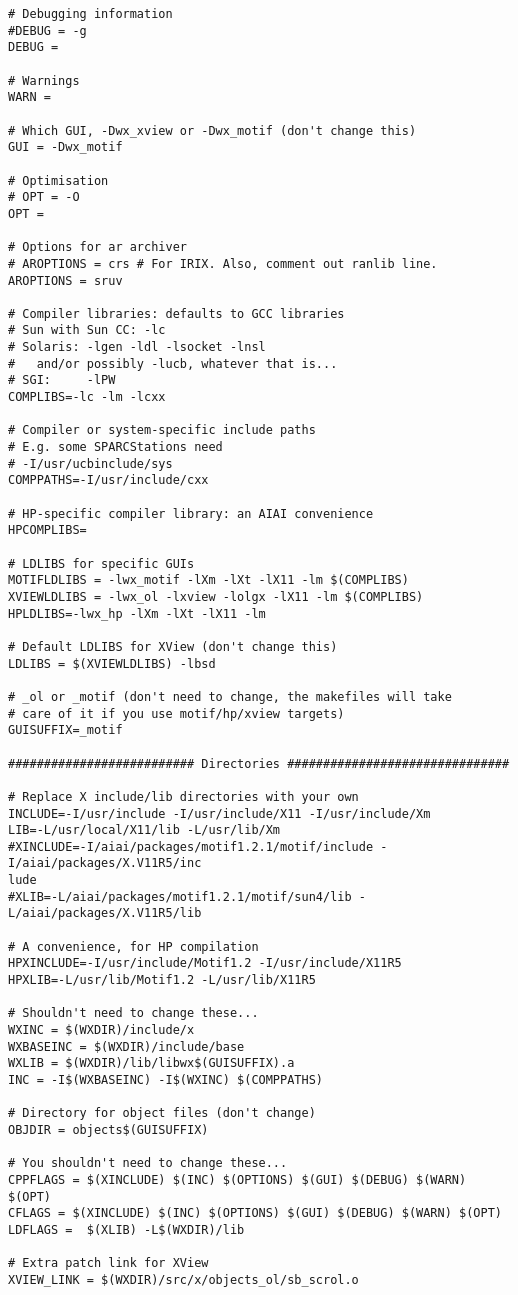 \begin{verbatim}
# Debugging information
#DEBUG = -g
DEBUG =

# Warnings
WARN = 

# Which GUI, -Dwx_xview or -Dwx_motif (don't change this)
GUI = -Dwx_motif

# Optimisation
# OPT = -O
OPT =

# Options for ar archiver
# AROPTIONS = crs # For IRIX. Also, comment out ranlib line.
AROPTIONS = sruv

# Compiler libraries: defaults to GCC libraries
# Sun with Sun CC: -lc
# Solaris: -lgen -ldl -lsocket -lnsl
#   and/or possibly -lucb, whatever that is...
# SGI:     -lPW
COMPLIBS=-lc -lm -lcxx

# Compiler or system-specific include paths
# E.g. some SPARCStations need
# -I/usr/ucbinclude/sys
COMPPATHS=-I/usr/include/cxx

# HP-specific compiler library: an AIAI convenience
HPCOMPLIBS=

# LDLIBS for specific GUIs
MOTIFLDLIBS = -lwx_motif -lXm -lXt -lX11 -lm $(COMPLIBS)
XVIEWLDLIBS = -lwx_ol -lxview -lolgx -lX11 -lm $(COMPLIBS)
HPLDLIBS=-lwx_hp -lXm -lXt -lX11 -lm

# Default LDLIBS for XView (don't change this)
LDLIBS = $(XVIEWLDLIBS) -lbsd

# _ol or _motif (don't need to change, the makefiles will take
# care of it if you use motif/hp/xview targets)
GUISUFFIX=_motif

########################## Directories ###############################

# Replace X include/lib directories with your own
INCLUDE=-I/usr/include -I/usr/include/X11 -I/usr/include/Xm
LIB=-L/usr/local/X11/lib -L/usr/lib/Xm
#XINCLUDE=-I/aiai/packages/motif1.2.1/motif/include -I/aiai/packages/X.V11R5/inc
lude
#XLIB=-L/aiai/packages/motif1.2.1/motif/sun4/lib -L/aiai/packages/X.V11R5/lib

# A convenience, for HP compilation
HPXINCLUDE=-I/usr/include/Motif1.2 -I/usr/include/X11R5
HPXLIB=-L/usr/lib/Motif1.2 -L/usr/lib/X11R5

# Shouldn't need to change these...
WXINC = $(WXDIR)/include/x
WXBASEINC = $(WXDIR)/include/base
WXLIB = $(WXDIR)/lib/libwx$(GUISUFFIX).a
INC = -I$(WXBASEINC) -I$(WXINC) $(COMPPATHS)

# Directory for object files (don't change)
OBJDIR = objects$(GUISUFFIX)

# You shouldn't need to change these...
CPPFLAGS = $(XINCLUDE) $(INC) $(OPTIONS) $(GUI) $(DEBUG) $(WARN) $(OPT)
CFLAGS = $(XINCLUDE) $(INC) $(OPTIONS) $(GUI) $(DEBUG) $(WARN) $(OPT)
LDFLAGS =  $(XLIB) -L$(WXDIR)/lib

# Extra patch link for XView
XVIEW_LINK = $(WXDIR)/src/x/objects_ol/sb_scrol.o
\end{verbatim}

